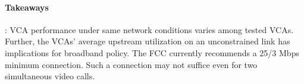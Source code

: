 
\begin{mdframed}[roundcorner=5pt, backgroundcolor=black!10]
\paragraph{Takeaways}: VCA performance under same network conditions varies
    among tested VCAs. Further, the VCAs' average upstream utilization on an unconstrained link has implications for broadband policy. The FCC currently recommends a 25/3 Mbps minimum connection. Such a connection may not suffice even for two simultaneous video calls. 
\end{mdframed}

